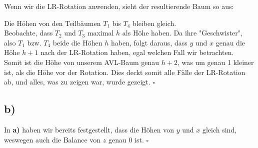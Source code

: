 \documentclass[12pt, a4paper]{article}
\newcommand*{\qed}{\null\nobreak\hfill\ensuremath{\square}}
\begin{document}
Wenn wir die LR-Rotation anwenden, sieht der resultierende Baum so aus:
\begin{center}
    \end{center}
Die Höhen von den Teilbäumen \(T_1\) bis \(T_4\) bleiben gleich.\\
Beobachte, dass \(T_2\) und \(T_3\) maximal \(h\) als Höhe haben. Da ihre "Geschwister", also \(T_1\) bzw. \(T_4\) beide die Höhen \(h\) haben, folgt daraus, dass \(y\) und \(x\) genau die Höhe \(h+1\) nach der LR-Rotation haben, egal welchen Fall wir betrachten. \\
Somit ist die Höhe von unserem AVL-Baum genau \(h+2\), was um genau 1 kleiner ist, als die Höhe vor der Rotation. Dies deckt somit alle Fälle der LR-Rotation ab, und alles, was zu zeigen war, wurde gezeigt. \qed
\subsection*{b)}
In  \textbf{a)} haben wir bereits festgestellt, dass die Höhen von \(y\) und \(x\) gleich sind, weswegen auch die Balance von \(z\) genau 0 ist. \qed
\end{document}
